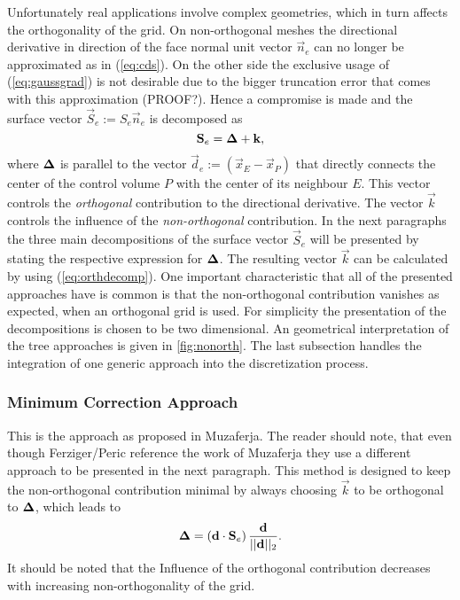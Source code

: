    Unfortunately real applications involve complex geometries, which in turn affects the orthogonality of the grid. On non-orthogonal meshes the directional derivative in direction of the face normal unit vector \(\vec{n}_e\) can no longer be approximated as in (\ref{eq:cds}). On the other side the exclusive usage of (\ref{eq:gaussgrad}) is not desirable due to the bigger truncation error that comes with this approximation (PROOF?). Hence a compromise is made and the surface vector \(\vec{S}_e := S_e \vec{n}_e\) is decomposed as
    \begin{equation}
      \label{eq:orthdecomp}
      \mathbf{S}_e = \boldsymbol{\Delta} + \mathbf{k},
    \end{equation}
    where \(\boldsymbol{\Delta}\) is parallel to the vector \(\vec{d}_e := \left(\vec{x}_E - \vec{x}_P\right)\) that directly connects the center of the control volume \(P\) with the center of its neighbour \(E\). This vector controls the \textit{orthogonal} contribution to the directional derivative. The vector \(\vec{k}\) controls the influence of the \textit{non-orthogonal} contribution. In the next paragraphs the three main decompositions of the surface vector \(\vec{S}_e\) will be presented by stating the respective expression for \(\boldsymbol{\Delta}\). The resulting vector \(\vec{k}\) can be calculated by using (\ref{eq:orthdecomp}). One important characteristic that all of the presented approaches have is common is that the non-orthogonal contribution vanishes as expected, when an orthogonal grid is used. For simplicity the presentation of the decompositions is chosen to be two dimensional. An geometrical interpretation of the tree approaches is given in \ref{fig:nonorth}. The last subsection handles the integration of one generic approach into the discretization process.

      \subsubsection{Minimum Correction Approach}

      This is the approach as proposed in Muzaferja. The reader should note, that even though Ferziger/Peric reference the work of Muzaferja they use a different approach to be presented in the next paragraph. This method is designed to keep the non-orthogonal contribution minimal by always choosing \(\vec{k}\) to be orthogonal to \(\boldsymbol{\Delta}\), which leads to
      \begin{displaymath}
        \boldsymbol{\Delta} = \left( \mathbf{d} \cdot \mathbf{S}_e \right) \frac{\mathbf{d}}{||\mathbf{d}||_2}.
      \end{displaymath}
      It should be noted that the Influence of the orthogonal contribution decreases with increasing non-orthogonality of the grid.

